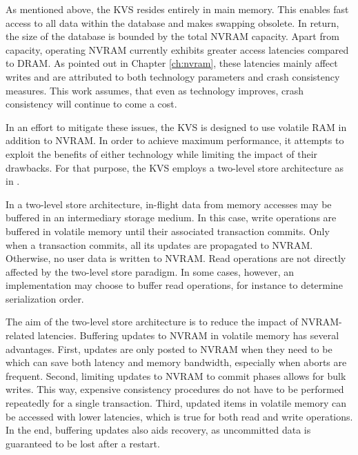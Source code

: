 As mentioned above, the KVS resides entirely in main memory. This enables fast
access to all data within the database and makes swapping obsolete. In return,
the size of the database is bounded by the total NVRAM capacity. Apart from
capacity, operating NVRAM currently exhibits greater access latencies compared
to DRAM. As pointed out in Chapter \ref{ch:nvram}, these latencies mainly affect
writes and are attributed to both technology parameters and crash consistency
measures. This work assumes, that even as technology improves, crash consistency
will continue to come a cost.

In an effort to mitigate these issues, the KVS is designed to use volatile RAM
in addition to NVRAM. In order to achieve maximum performance, it attempts to
exploit the benefits of either technology while limiting the impact of their
drawbacks. For that purpose, the KVS employs a two-level store architecture as
in \cite{bailey2013exploring}.

In a two-level store architecture, in-flight data from memory accesses may be
buffered in an intermediary storage medium. In this case, write operations are
buffered in volatile memory until their associated transaction commits. Only
when a transaction commits, all its updates are propagated to NVRAM. Otherwise,
no user data is written to NVRAM. Read operations are not directly affected by
the two-level store paradigm. In some cases, however, an implementation may
choose to buffer read operations, for instance to determine serialization order.

The aim of the two-level store architecture is to reduce the impact of
NVRAM-related latencies. Buffering updates to NVRAM in volatile memory has
several advantages. First, updates are only posted to NVRAM when they need to
be which can save both latency and memory bandwidth, especially when aborts are
frequent. Second, limiting updates to NVRAM to commit phases allows for bulk
writes. This way, expensive consistency procedures do not have to be performed
repeatedly for a single transaction. Third, updated items in volatile memory can
be accessed with lower latencies, which is true for both read and write
operations. In the end, buffering updates also aids recovery, as uncommitted
data is guaranteed to be lost after a restart.

